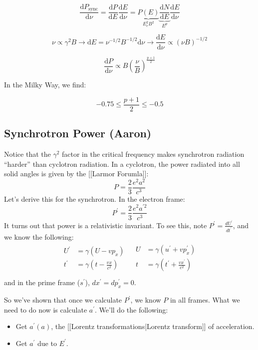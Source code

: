 \documentclass{article}
\def\xp{{x^{\prime}}}
\begin{document}
$$
\frac{\mathrm{d}P_\text{sync}}{\mathrm{d}\nu} = \frac{\mathrm{d}P}{\mathrm{d}E}\frac{\mathrm{d}E}{\mathrm{d}\nu} = \underbrace{P(E)}_{E_e^2 B^2} \underbrace{\frac{\mathrm{d}N}{\mathrm{d}E}}_{E^p}\frac{\mathrm{d}E}{\mathrm{d}\nu}
$$

$$
\nu \propto \gamma^2 B \to \mathrm{d}E = \nu^{-1/2}B^{-1/2} \mathrm{d}\nu \rightarrow \frac{\mathrm{d}E}{\mathrm{d}\nu} \propto \left(\nu B\right)^{-1/2}
$$

$$
\boxed{\frac{\mathrm{d}P}{\mathrm{d}\nu} \propto B \left(\frac{\nu}{B}\right)^{\frac{p+1}{2}}}
$$

In the Milky Way, we find:

$$
-0.75 \leq \frac{p+1}{2} \leq -0.5
$$

\subsection{Synchrotron Power (Aaron)}

Notice that the $\gamma^2$ factor in the critical frequency makes synchrotron radiation ``harder'' than
cyclotron radiation.  In a cyclotron, the power radiated into all solid
angles is given by the [[Larmor Forumla]]:
$$P=\frac{2}{3}\frac{e^2a^2}{ c^3}$$
Let's derive this for the synchrotron.  In the electron frame:
$$P^\prime=\frac{2}{3}\frac{e^2a^{\prime 2}}{ c^3}$$
It turns out that power is a relativistic invariant.  To see this, note
$P^\prime=\frac{dU^\prime}{ dt^\prime}$, and we know the following:
$$\begin{matrix}
\begin{aligned} U^\prime&=\gamma(U-vp_x)\\ 
t^\prime&=\gamma(t-\frac{vx}{ c^2})\\ \end{aligned}&
\begin{aligned} U&=\gamma(u^\prime+vp_x^\prime)\\ 
t&=\gamma(t^\prime+\frac{v\xp}{ c^2})\\ \end{aligned}
\end{matrix}$$
and in the prime frame  ($s^\prime$), $d\xp=dp_x^\prime=0$.\par
So we've shown that once we calculate $P^\prime$, we know $P$ in all frames.
What we need to do now is calculate $a^\prime$.  We'll do the following:
\begin{itemize}
\item  Get $a^\prime(a)$, the [[Lorentz transformations|Lorentz transform]] of acceleration.
\item  Get $a^\prime$ due to $E^\prime$.
\end{itemize}
\end{document}
